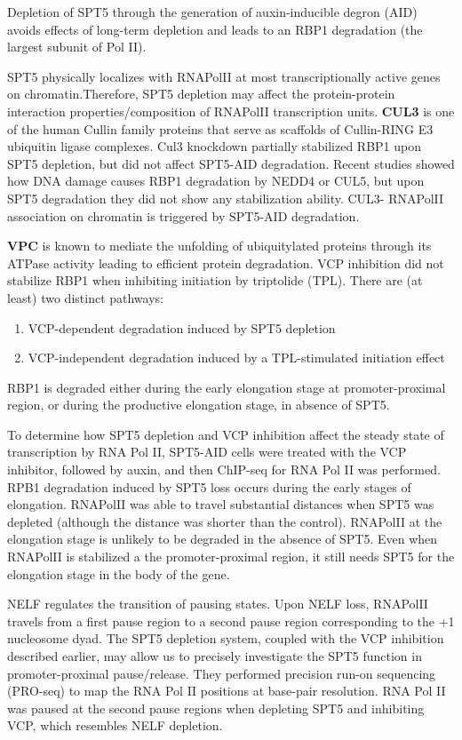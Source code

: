 Depletion of SPT5 through the generation of auxin-inducible degron (AID) avoids effects of long-term depletion and leads to an RBP1 degradation (the largest subunit of Pol II). 

SPT5 physically localizes with RNAPolII at most transcriptionally active genes on chromatin.Therefore, SPT5 depletion may affect the protein-protein interaction properties/composition of RNAPolII transcription units. \textbf{CUL3} is one of the human Cullin family proteins that serve as scaffolds of Cullin-RING E3 ubiquitin ligase complexes. Cul3 knockdown partially stabilized RBP1 upon SPT5 depletion, but did not affect SPT5-AID degradation. Recent studies showed how DNA damage causes RBP1 degradation by NEDD4 or CUL5, but upon SPT5 degradation they did not show any stabilization ability. CUL3- RNAPolII association on chromatin is triggered by SPT5-AID degradation.

\textbf{VPC} is known to mediate the unfolding of ubiquitylated proteins through its ATPase activity leading to efficient protein degradation.
VCP inhibition did not stabilize RBP1 when inhibiting initiation by triptolide (TPL).
There are (at least) two distinct pathways:
\begin{enumerate}
\tightlist
\item VCP-dependent degradation induced by SPT5 depletion
\item VCP-independent degradation induced by a TPL-stimulated initiation effect
\end{enumerate}
RBP1 is degraded either during the early elongation stage at promoter-proximal region, or during the productive elongation stage, in absence of SPT5.

To determine how SPT5 depletion and VCP inhibition affect the steady state of transcription by RNA Pol II, SPT5-AID cells were treated with the VCP inhibitor, followed by auxin, and then ChIP-seq for RNA Pol II was performed. RPB1 degradation induced by SPT5 loss occurs during the early stages of elongation. RNAPolII was able to travel substantial distances when SPT5 was depleted (although the distance was shorter than the control). RNAPolII at the elongation stage is unlikely to be degraded in the absence of SPT5. Even when RNAPolII is stabilized a the promoter-proximal region, it still needs SPT5 for the elongation stage in the body of the gene.

NELF regulates the transition of pausing states. Upon NELF loss, RNAPolII travels from a first pause region to a second pause region corresponding to the +1 nucleosome dyad. The SPT5 depletion system, coupled with the VCP inhibition described earlier, may allow us to precisely
investigate the SPT5 function in promoter-proximal pause/release. They performed precision run-on sequencing (PRO-seq) to map the RNA Pol II positions at base-pair resolution. RNA Pol II was paused at the second pause regions when depleting SPT5 and inhibiting VCP, which resembles NELF depletion.

